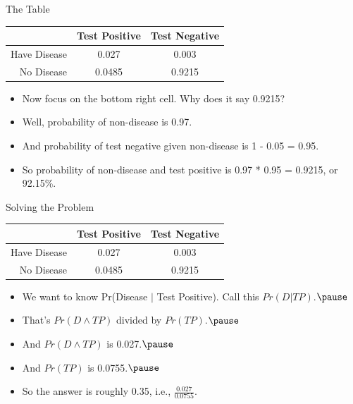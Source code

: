 \documentclass[
  ignorenonframetext,
]{beamer}
\providecommand{\tightlist}{%
  \setlength{\itemsep}{0pt}\setlength{\parskip}{0pt}}
\renewcommand{\,}{\text{, }}
\begin{document}
\begin{frame}{The Table}
\protect\hypertarget{the-table-4}{}
\begin{longtable}[]{@{}rcc@{}}
\toprule
& Test Positive & Test Negative \\
\midrule
\endhead
Have Disease & 0.027 & 0.003 \\
No Disease & 0.0485 & 0.9215 \\
\bottomrule
\end{longtable}

\begin{itemize}
\tightlist
\item
  Now focus on the bottom right cell. Why does it say 0.9215?
\item
  Well, probability of non-disease is 0.97.
\item
  And probability of test negative given non-disease is 1 - 0.05 = 0.95.
\item
  So probability of non-disease and test positive is 0.97 * 0.95 =
  0.9215, or 92.15\%.
\end{itemize}
\end{frame}

\begin{frame}{Solving the Problem}
\protect\hypertarget{solving-the-problem}{}
\begin{longtable}[]{@{}rcc@{}}
\toprule
& Test Positive & Test Negative \\
\midrule
\endhead
Have Disease & 0.027 & 0.003 \\
No Disease & 0.0485 & 0.9215 \\
\bottomrule
\end{longtable}

\begin{itemize}
\tightlist
\item
  We want to know Pr(Disease \(|\) Test Positive). Call this
  \(Pr(D | TP)\).\(\pause\)
\item
  That's \(Pr(D \wedge TP)\) divided by \(Pr(TP)\).\(\pause\)
\item
  And \(Pr(D \wedge TP)\) is 0.027.\(\pause\)
\item
  And \(Pr(TP)\) is 0.0755.\(\pause\)
\item
  So the answer is roughly 0.35, i.e., \(\frac{0.027}{0.0755}\).
\end{itemize}
\end{frame}
\end{document}
